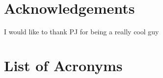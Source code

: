 \clearpage

\chapter*{Acknowledgements}

I would like to thank PJ for being a really cool guy





\clearpage

\tableofcontents

\newpage

\chapter*{List of Acronyms}

\newpage

\listoffigures
{}
\newpage

\listoftables
{}

\mainmatter 
